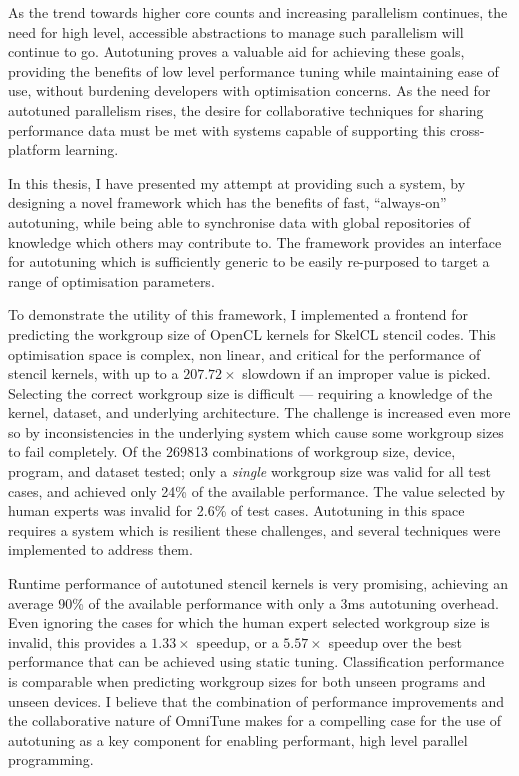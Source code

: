 As the trend towards higher core counts and increasing parallelism
continues, the need for high level, accessible abstractions to manage
such parallelism will continue to go. Autotuning proves a valuable aid
for achieving these goals, providing the benefits of low level
performance tuning while maintaining ease of use, without burdening
developers with optimisation concerns. As the need for autotuned
parallelism rises, the desire for collaborative techniques for sharing
performance data must be met with systems capable of supporting this
cross-platform learning.

In this thesis, I have presented my attempt at providing such a
system, by designing a novel framework which has the benefits of fast,
``always-on'' autotuning, while being able to synchronise data with
global repositories of knowledge which others may contribute to. The
framework provides an interface for autotuning which is sufficiently
generic to be easily re-purposed to target a range of optimisation
parameters.

To demonstrate the utility of this framework, I implemented a frontend
for predicting the workgroup size of OpenCL kernels for SkelCL stencil
codes. This optimisation space is complex, non linear, and critical
for the performance of stencil kernels, with up to a $207.72\times$
slowdown if an improper value is picked. Selecting the correct
workgroup size is difficult --- requiring a knowledge of the kernel,
dataset, and underlying architecture. The challenge is increased even
more so by inconsistencies in the underlying system which cause some
workgroup sizes to fail completely. Of the 269813 combinations of
workgroup size, device, program, and dataset tested; only a
\emph{single} workgroup size was valid for all test cases, and
achieved only 24\% of the available performance. The value selected by
human experts was invalid for 2.6\% of test cases. Autotuning in this
space requires a system which is resilient these challenges, and
several techniques were implemented to address them.

Runtime performance of autotuned stencil kernels is very promising,
achieving an average 90\% of the available performance with only a 3ms
autotuning overhead. Even ignoring the cases for which the human
expert selected workgroup size is invalid, this provides a
$1.33\times$ speedup, or a $5.57\times$ speedup over the best
performance that can be achieved using static tuning. Classification
performance is comparable when predicting workgroup sizes for both
unseen programs and unseen devices. I believe that the combination of
performance improvements and the collaborative nature of OmniTune
makes for a compelling case for the use of autotuning as a key
component for enabling performant, high level parallel programming.


